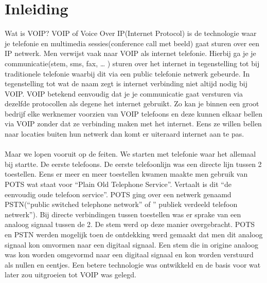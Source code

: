 \documentclass[pdftex,a4paper,12pt,twoside]{report}
\begin{document}

\tableofcontents



\chapter{Inleiding}
\label{ch:inleiding}

Wat is VOIP? VOIP of Voice Over IP(Internet Protocol) is de technologie waar je telefonie en multimedia sessies(conference call met beeld) gaat sturen over een IP netwerk. Men verwijst vaak naar VOIP als internet telefonie. Hierbij ga je je communicatie(stem, sms, fax, … ) sturen over het internet in tegenstelling tot bij traditionele telefonie waarbij dit via een public telefonie netwerk gebeurde. In tegenstelling tot wat de naam zegt is internet verbinding niet altijd nodig bij VOIP. VOIP betekend eenvoudig dat je je communicatie gaat versturen via dezelfde protocollen als degene het internet gebruikt. Zo kan je binnen een groot bedrijf elke werknemer voorzien van VOIP telefoons en deze kunnen elkaar bellen via VOIP zonder dat ze verbinding maken met het internet. Eens ze willen bellen naar locaties buiten hun netwerk dan komt er uiteraard internet aan te pas.\\ \\
Maar we lopen vooruit op de feiten. We starten met telefonie waar het allemaal bij startte. De eerste telefoons. De eerste telefoonlijn was een directe lijn tussen 2 toestellen. Eens er meer en meer toestellen kwamen maakte men gebruik van POTS wat staat voor “Plain Old Telephone Service”. Vertaalt is dit “de eenvoudig oude telefoon service”. POTS ging over een netwerk genaamd PSTN(“public switched telephone network” of ” publiek verdeeld telefoon netwerk”). Bij directe verbindingen tussen toestellen was er sprake van een analoog signaal tussen de 2. De stem werd op deze manier overgebracht. POTS en PSTN werden mogelijk toen de ontdekking werd gemaakt dat men dit analoog signaal kon omvormen naar een digitaal signaal. Een stem die in origine analoog was kon worden omgevormd naar een digitaal signaal en kon worden verstuurd als nullen en eentjes. Een betere technologie was ontwikkeld en de basis voor wat later zou uitgroeien tot VOIP was gelegd. \\ \\
\end{document}

